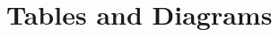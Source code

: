 \documentclass[10pt]{article}
\begin{document}
\pagebreak[4]

\section {Tables and Diagrams}







\end{document}
